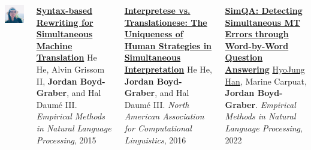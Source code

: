 \documentclass[compress]{beamer}
\begin{document}
\begin{frame}{}
\begin{columns}
\begin{center}
        \includegraphics[width=0.8\linewidth]{general_figures/hyojung}
        \end{center}

        \begin{block}{ {\bf
              \href{http://umiacs.umd.edu/~jbg//docs/2015_emnlp_rewrite.pdf}{Syntax-based
                Rewriting for Simultaneous Machine Translation}}}
          \small
He He, Alvin Grissom II, {\bf Jordan Boyd-Graber}, and Hal {Daum\'{e} III}.  \emph{Empirical Methods in Natural Language Processing}, 2015
        \end{block}

        \begin{block}{ {\bf
              \href{http://umiacs.umd.edu/~jbg/docs/2016_naacl_interpretese.pdf}{Interpretese
                vs. Translationese: The Uniqueness of Human Strategies
                in Simultaneous Interpretation}}}
          \small
He He, {\bf Jordan Boyd-Graber}, and Hal {Daum\'{e} III}.
\emph{North American Association for Computational Linguistics}, 2016
        \end{block}


        \begin{block}{ {\bf
              \href{http://umiacs.umd.edu/~jbg/docs/2022_emnlp_simint.pdf}{SimQA:
                Detecting Simultaneous MT Errors through 
                Word-by-Word Question Answering}}}
          \small
          \href{https://h-j-han.github.io/}{HyoJung Han}, Marine
            Carpuat, {\bf Jordan Boyd-Graber}.  \emph{Empirical Methods in Natural Language Processing}, 2022
          
          \end{block}
  \end{columns}


\end{frame}
\end{document}
